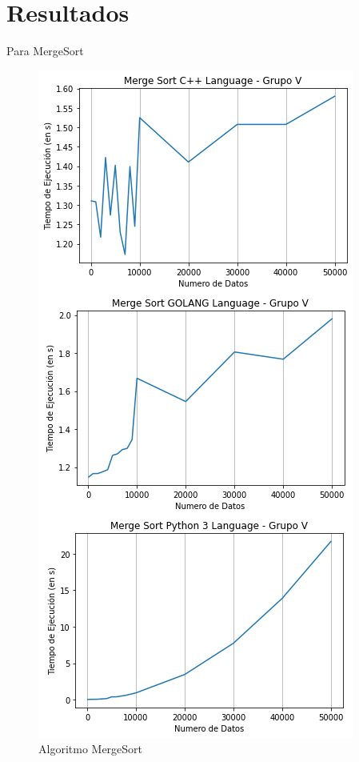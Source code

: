 \documentclass{article}
\begin{document}
\section{Resultados}
Para MergeSort 
    \begin{figure}[h!]
        \centering
        \includegraphics[scale=0.4]{img/finalmerg.png}
        \caption{Algoritmo MergeSort}
        \label{fig:my_label}
    \end{figure}
\end{document}
